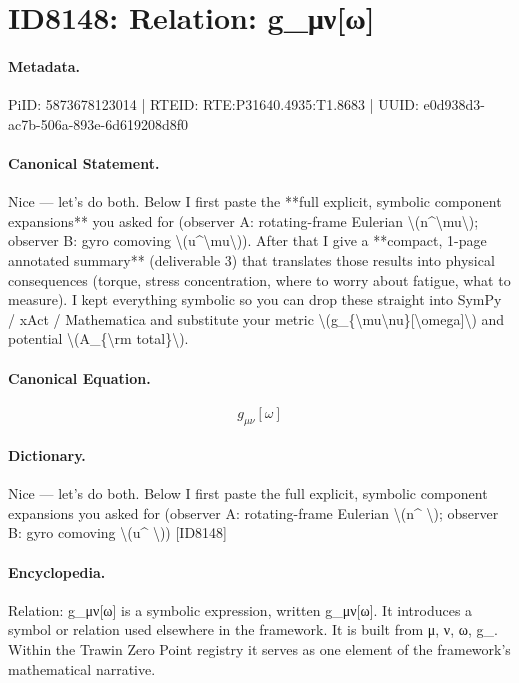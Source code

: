 \section*{ID8148: Relation: g\_μν[ω]}
\paragraph{Metadata.}
PiID: 5873678123014 | RTEID: RTE:P31640.4935:T1.8683 | UUID: e0d938d3-ac7b-506a-893e-6d619208d8f0

\paragraph{Canonical Statement.}
Nice — let’s do both. Below I first paste the **full explicit, symbolic component expansions** you asked for (observer A: rotating-frame Eulerian \textbackslash{}(n\textasciicircum{}\textbackslash{}mu\textbackslash{}); observer B: gyro comoving \textbackslash{}(u\textasciicircum{}\textbackslash{}mu\textbackslash{})). After that I give a **compact, 1-page annotated summary** (deliverable 3) that translates those results into physical consequences (torque, stress concentration, where to worry about fatigue, what to measure). I kept everything symbolic so you can drop these straight into SymPy / xAct / Mathematica and substitute your metric \textbackslash{}(g\_\{\textbackslash{}mu\textbackslash{}nu\}[\textbackslash{}omega]\textbackslash{}) and potential \textbackslash{}(A\_\{\textbackslash{}rm total\}\textbackslash{}).

\paragraph{Canonical Equation.}
\[
g_{\mu\nu}[\omega]
\]

\paragraph{Dictionary.}
Nice — let’s do both. Below I first paste the full explicit, symbolic component expansions you asked for (observer A: rotating-frame Eulerian \textbackslash{}(n\textasciicircum{} \textbackslash{}); observer B: gyro comoving \textbackslash{}(u\textasciicircum{} \textbackslash{})) [ID8148]

\paragraph{Encyclopedia.}
Relation: g\_μν[ω] is a symbolic expression, written g\_μν[ω]. It introduces a symbol or relation used elsewhere in the framework. It is built from μ, ν, ω, g\_. Within the Trawin Zero Point registry it serves as one element of the framework's mathematical narrative.
